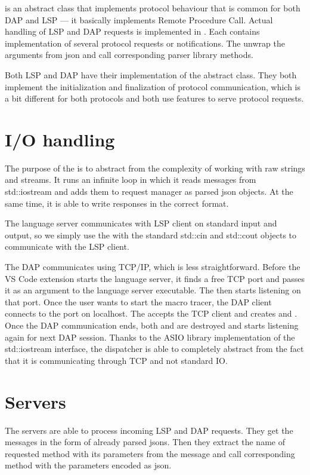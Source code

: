  is an abstract class that implements protocol behaviour that is common for both DAP and LSP --- it basically implements Remote Procedure Call. Actual handling of LSP and DAP requests is implemented in . Each  contains implementation of several protocol requests or notifications. The  unwrap the arguments from json and call corresponding parser library methods.

Both LSP and DAP have their implementation of the abstract  class. They both implement the initialization and finalization of protocol communication, which is a bit different for both protocols and both use features to serve protocol requests.


\section{I/O handling}
The purpose of the  is to abstract from the complexity of working with raw strings and streams. It runs an infinite loop in which it reads messages from std::iostream and adds them to request manager as parsed json objects. At the same time, it is able to write responses in the correct format.

The language server communicates with LSP client on standard input and output, so we simply use the  with the standard std::cin and std::cout objects to communicate with the LSP client.

The DAP communicates using TCP/IP, which is less straightforward. Before the VS Code extension starts the language server, it finds a free TCP port and passes it as an argument to the language server executable. The  then starts listening on that port. Once the user wants to start the macro tracer, the DAP client connects to the port on localhost. The  accepts the TCP client and creates  and . Once the DAP communication ends, both  and  are destroyed and  starts listening again for next DAP session. Thanks to the ASIO library implementation of the std::iostream interface, the dispatcher is able to completely abstract from the fact that it is communicating through TCP and not standard IO.

\section{Servers}
The servers are able to process incoming LSP and DAP requests. They get the messages in the form of already parsed jsons. Then they extract the name of requested method with its parameters from the message and call corresponding method with the parameters encoded as json.

